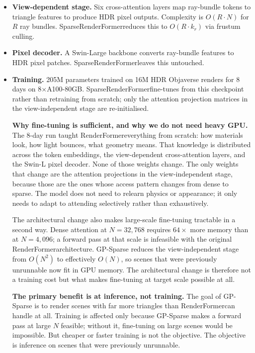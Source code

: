 \documentclass[11pt,letterpaper]{article}
\newcommand{\ours}{SparseRenderFormer}
\newcommand{\RF}{RenderFormer}
\begin{document}
\begin{itemize}
  \item \textbf{View-dependent stage.}
    Six cross-attention layers map ray-bundle tokens to triangle features
    to produce HDR pixel outputs.
    Complexity is $O(R \cdot N)$ for $R$ ray bundles.
    \ours reduces this to $O(R \cdot k_r)$ via frustum culling.

  \item \textbf{Pixel decoder.}
    A Swin-Large backbone converts ray-bundle features to HDR pixel
    patches. \ours leaves this untouched.

  \item \textbf{Training.}
    205M parameters trained on 16M HDR Objaverse renders for 8 days on
    8$\times$A100-80GB.
    \ours fine-tunes from this checkpoint rather than retraining from
    scratch; only the attention projection matrices in the view-independent
    stage are re-initialised.

    \textbf{Why fine-tuning is sufficient, and why we do not need heavy GPU.}
    The 8-day run taught \RF everything from scratch: how materials look,
    how light bounces, what geometry means.
    That knowledge is distributed across the token embeddings, the
    view-dependent cross-attention layers, and the Swin-L pixel decoder.
    None of those weights change.
    The only weights that change are the attention projections in the
    view-independent stage, because those are the ones whose access
    pattern changes from dense to sparse.
    The model does not need to relearn physics or appearance; it only
    needs to adapt to attending selectively rather than exhaustively.

    The architectural change also makes large-scale fine-tuning tractable
    in a second way.
    Dense attention at $N = 32{,}768$ requires $64\times$ more memory than
    at $N = 4{,}096$; a forward pass at that scale is infeasible with the
    original \RF architecture.
    GP-Sparse reduces the view-independent stage from $O(N^2)$ to
    effectively $O(N)$, so scenes that were previously unrunnable now fit
    in GPU memory.
    The architectural change is therefore not a training cost but what
    makes fine-tuning at target scale possible at all.

    \textbf{The primary benefit is at inference, not training.}
    The goal of GP-Sparse is to render scenes with far more triangles
    than \RF can handle at all.
    Training is affected only because GP-Sparse makes a forward pass at
    large $N$ feasible; without it, fine-tuning on large scenes would
    be impossible.
    But cheaper or faster training is not the objective.
    The objective is inference on scenes that were previously unrunnable.


\end{itemize}
\end{document}
